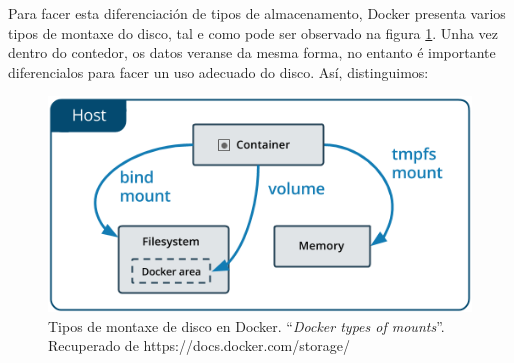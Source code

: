 Para facer esta diferenciación de tipos de almacenamento, Docker presenta varios tipos de montaxe do disco, tal e como pode ser observado na figura \ref{typesOfMountsDocker}. Unha vez dentro do contedor, os datos veranse da mesma forma, no entanto é importante diferencialos para facer un uso adecuado do disco. Así, distinguimos:

\begin{figure}
\centerline{\includegraphics[width=15cm]{figuras/typesOfMountsDocker.png}}
\caption{Tipos de montaxe de disco en Docker. ``\textit{Docker types of mounts}''. Recuperado de https://docs.docker.com/storage/}
\label{typesOfMountsDocker}
\end{figure}

